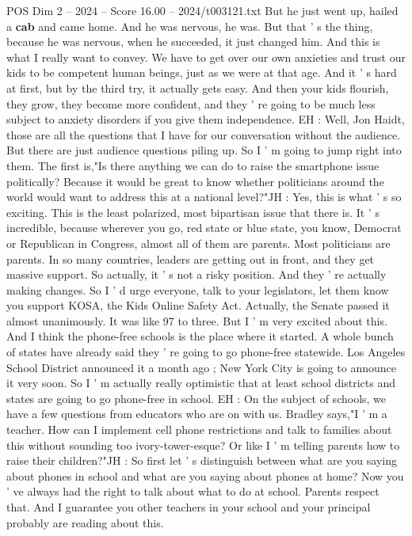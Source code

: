 \begin{textsample}{POS Dim 2 – 2024 – Score 16.00 – 2024/t003121.txt}
But he just went up, hailed a \textbf{cab} and came home.
And he was nervous, he was.
But that ' s the thing, because he was nervous, when he succeeded, it just changed him.
And this is what I really want to convey.
We have to get over our own anxieties and trust our kids to be competent human beings, just as we were at that age.
And it ' s hard at first, but by the third try, it actually gets easy.
And then your kids flourish, they grow, they become more confident, and they ' re going to be much less subject to anxiety disorders if you give them independence.
EH : Well, Jon Haidt, those are all the questions that I have for our conversation without the audience.
But there are just audience questions piling up.
So I ' m going to jump right into them.
The first is,"Is there anything we can do to raise the smartphone issue politically?
Because it would be great to know whether politicians around the world would want to address this at a national level?"JH : Yes, this is what ' s so exciting.
This is the least polarized, most bipartisan issue that there is.
It ' s incredible, because wherever you go, red state or blue state, you know, Democrat or Republican in Congress, almost all of them are parents.
Most politicians are parents.
In so many countries, leaders are getting out in front, and they get massive support.
So actually, it ' s not a risky position.
And they ' re actually making changes.
So I ' d urge everyone, talk to your legislators, let them know you support KOSA, the Kids Online Safety Act.
Actually, the Senate passed it almost unanimously.
It was like 97 to three.
But I ' m very excited about this.
And I think the phone-free schools is the place where it started.
A whole bunch of states have already said they ' re going to go phone-free statewide.
Los Angeles School District announced it a month ago ; New York City is going to announce it very soon.
So I ' m actually really optimistic that at least school districts and states are going to go phone-free in school.
EH : On the subject of schools, we have a few questions from educators who are on with us.
Bradley says,"I ' m a teacher.
How can I implement cell phone restrictions and talk to families about this without sounding too ivory-tower-esque?
Or like I ' m telling parents how to raise their children?"JH : So first let ' s distinguish between what are you saying about phones in school and what are you saying about phones at home?
Now you ' ve always had the right to talk about what to do at school.
Parents respect that.
And I guarantee you other teachers in your school and your principal probably are reading about this.

\end{textsample}
